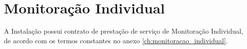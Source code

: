 \chapter{Monitoração Individual}
A Instalação possui contrato de prestação de serviço de Monitoração Individual, de acordo com os termos constantes no anexo \ref{ch:monitoracao_individual}.